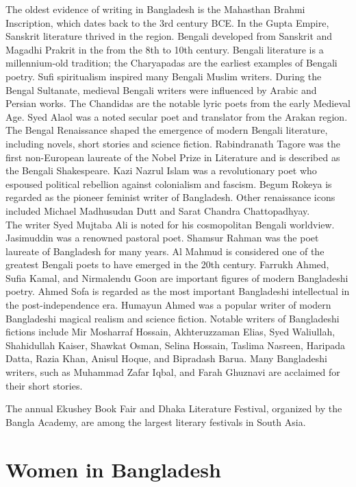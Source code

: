 The oldest evidence of writing in Bangladesh is the Mahasthan Brahmi
Inscription, which dates back to the 3rd century BCE. In the Gupta
Empire, Sanskrit literature thrived in the region. Bengali developed
from Sanskrit and Magadhi Prakrit in the from the 8th to 10th century.
Bengali literature is a millennium-old tradition; the Charyapadas are
the earliest examples of Bengali poetry. Sufi spiritualism inspired many
Bengali Muslim writers. During the Bengal Sultanate, medieval Bengali
writers were influenced by Arabic and Persian works. The Chandidas are
the notable lyric poets from the early Medieval Age. Syed Alaol was a
noted secular poet and translator from the Arakan region. The Bengal
Renaissance shaped the emergence of modern Bengali literature, including
novels, short stories and science fiction. Rabindranath Tagore was the
first non-European laureate of the Nobel Prize in Literature and is
described as the Bengali Shakespeare. Kazi Nazrul Islam was a
revolutionary poet who espoused political rebellion against colonialism
and fascism. Begum Rokeya is regarded as the pioneer feminist writer of
Bangladesh. Other renaissance icons included Michael Madhusudan Dutt and
Sarat Chandra Chattopadhyay.\\
The writer Syed Mujtaba Ali is noted for his cosmopolitan Bengali
worldview. Jasimuddin was a renowned pastoral poet. Shamsur Rahman was
the poet laureate of Bangladesh for many years. Al Mahmud is considered
one of the greatest Bengali poets to have emerged in the 20th century.
Farrukh Ahmed, Sufia Kamal, and Nirmalendu Goon are important figures of
modern Bangladeshi poetry. Ahmed Sofa is regarded as the most important
Bangladeshi intellectual in the post-independence era. Humayun Ahmed was
a popular writer of modern Bangladeshi magical realism and science
fiction. Notable writers of Bangladeshi fictions include Mir Mosharraf
Hossain, Akhteruzzaman Elias, Syed Waliullah, Shahidullah Kaiser,
Shawkat Osman, Selina Hossain, Taslima Nasreen, Haripada Datta, Razia
Khan, Anisul Hoque, and Bipradash Barua. Many Bangladeshi writers, such
as Muhammad Zafar Iqbal, and Farah Ghuznavi are acclaimed for their
short stories.

The annual Ekushey Book Fair and Dhaka Literature Festival, organized by
the Bangla Academy, are among the largest literary festivals in South
Asia.

\section{Women in Bangladesh}\label{women-in-bangladesh}

